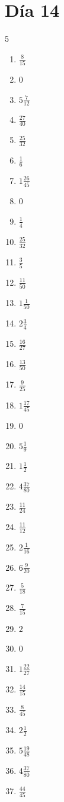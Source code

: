 \documentclass[12pt]{article}
\begin{document}
\section*{Día 14}
\begin{multicols}{5}\begin{enumerate}
\item $ \frac{8}{15} $
\item $ 0 $
\item $ 5 \frac{7}{12} $
\item $ \frac{27}{40} $
\item $ \frac{25}{32} $
\item $ \frac{1}{6} $
\item $ 1 \frac{26}{45} $
\item $ 0 $
\item $ \frac{1}{4} $
\item $ \frac{25}{32} $
\item $ \frac{3}{5} $
\item $ \frac{11}{50} $
\item $ 1 \frac{1}{50} $
\item $ 2 \frac{3}{4} $
\item $ \frac{16}{27} $
\item $ \frac{13}{50} $
\item $ \frac{9}{25} $
\item $ 1 \frac{17}{45} $
\item $ 0 $
\item $ 5 \frac{1}{9} $
\item $ 1 \frac{1}{2} $
\item $ 4 \frac{37}{80} $
\item $ \frac{11}{24} $
\item $ \frac{11}{12} $
\item $ 2 \frac{1}{16} $
\item $ 6 \frac{9}{20} $
\item $ \frac{5}{18} $
\item $ \frac{7}{15} $
\item $ 2 $
\item $ 0 $
\item $ 1 \frac{22}{27} $
\item $ \frac{14}{15} $
\item $ \frac{8}{45} $
\item $ 2 \frac{1}{2} $
\item $ 5 \frac{19}{48} $
\item $ 4 \frac{37}{80} $
\item $ \frac{44}{45} $

\end{enumerate}
\end{multicols}
\end{document}

